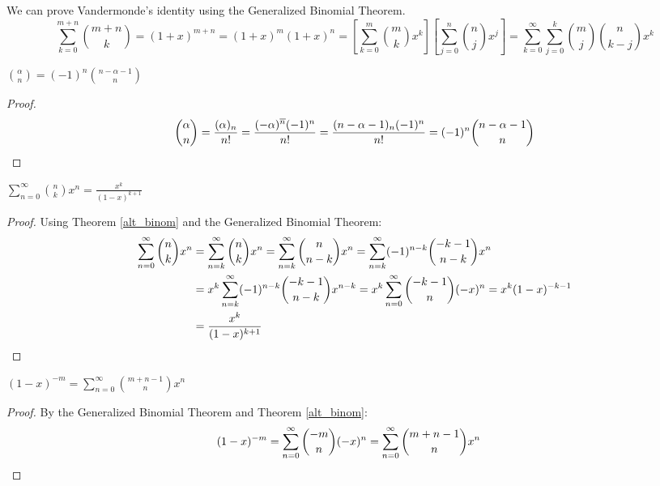 \documentclass[a4paper]{article}
\begin{document}
\begin{example}
We can prove Vandermonde's identity using the Generalized Binomial Theorem.
\begin{equation*}
\sum_{k=0}^{m+n}\binom{m+n}k=(1+x)^{m+n}=(1+x)^m(1+x)^n=\left[\sum_{k=0}^m\binom mkx^k\right]\left[\sum_{j=0}^n\binom njx^j\right]=\sum_{k=0}^\infty\sum_{j=0}^k\binom mj\binom n{k-j}x^k
\end{equation*}
\end{example}

\begin{theorem}\label{alt_binom}
$\displaystyle\binom \alpha n=(-1)^n\binom{n-\alpha-1}n$

\begin{hl}
\begin{proof}
\begin{equation*}
\binom\alpha n
=\frac{(\alpha)_n}{n!}
=\frac{(-\alpha)^{\overline n}(-1)^n}{n!}
=\frac{(n-\alpha-1)_n(-1)^n}{n!}
=(-1)^n\binom{n-\alpha-1}n\qedhere
\end{equation*}
\end{proof}
\end{hl}
\end{theorem}

\begin{theorem}\label{sum_bin_times_monom}
$\displaystyle\sum_{n=0}^\infty\binom nkx^n=\frac{x^k}{(1-x)^{k+1}}$

\begin{hl}
\begin{proof}
Using Theorem \ref{alt_binom} and the Generalized Binomial Theorem:
\begin{align*}
\sum_{n=0}^\infty\binom nkx^n
&= \sum_{n=k}^\infty\binom nkx^n
= \sum_{n=k}^\infty\binom n{n-k}x^n
= \sum_{n=k}^\infty(-1)^{n-k}\binom{-k-1}{n-k}x^n\\
&= x^k\sum_{n=k}^\infty(-1)^{n-k}\binom{-k-1}{n-k}x^{n-k}
= x^k\sum_{n=0}^\infty\binom{-k-1}{n}(-x)^{n}
= x^k(1-x)^{-k-1}\\
&=\frac{x^k}{(1-x)^{k+1}}\qedhere
\end{align*}
\end{proof}
\end{hl}
\end{theorem}

\begin{theorem}
$\displaystyle(1-x)^{-m}=\sum_{n=0}^\infty\binom{m+n-1}nx^n$

\begin{hl}
\begin{proof}
By the Generalized Binomial Theorem and Theorem \ref{alt_binom}:
\begin{align*}
(1-x)^{-m}
&=\sum_{n=0}^\infty\binom{-m}n(-x)^n
=\sum_{n=0}^\infty\binom{m+n-1}nx^n\qedhere
\end{align*}
\end{proof}
\end{hl}
\end{theorem}
\end{document}
